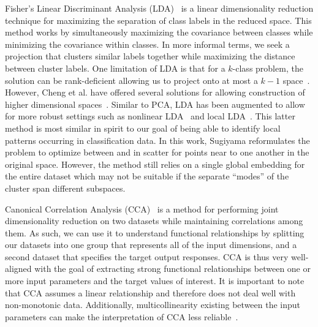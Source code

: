Fisher's Linear Discriminant Analysis (LDA)~\cite{Fisher1936} is a linear dimensionality reduction technique for maximizing the separation of class labels in the reduced space.
%
This method works by simultaneously maximizing the covariance between classes while minimizing the covariance within classes.
%
In more informal terms, we seek a projection that clusters similar labels together while maximizing the distance between cluster labels.
%
One limitation of LDA is that for a $k$-class problem, the solution can be rank-deficient allowing us to project onto at most a $k-1$ space~\cite{MaszczykDuch2008}.
%
However, Cheng et al. have offered several solutions for allowing construction of higher dimensional spaces~\cite{ChengZhuangYang1992}.
%
Similar to PCA, LDA has been augmented to allow for more robust settings such as nonlinear LDA~\cite{MikaRatschWeston1999,McLachlan2004} and local LDA~\cite{Sugiyama2006}.
%
This latter method is most similar in spirit to our goal of being able to identify local patterns occurring in classification data.
%
In this work, Sugiyama reformulates the problem to optimize between and in scatter for points near to one another in the original space.
%
However, the method still relies on a single global embedding for the entire dataset which may not be suitable if the separate ``modes'' of the cluster span different subspaces.

Canonical Correlation Analysis (CCA)~\cite{Hotelling1935,HardoonSzedmakShawe-Taylor2004} is a method for performing joint dimensionality reduction on two datasets while maintaining correlations among them.
%
As such, we can use it to understand functional relationships by splitting our datasets into one group that represents all of the input dimensions, and a second dataset that specifies the target output responses.
%
CCA is thus very well-aligned with the goal of extracting strong functional relationships between one or more input parameters and the target values of interest.
%
It is important to note that CCA assumes a linear relationship and therefore does not deal well with non-monotonic data.
%
Additionally, multicollinearity existing between the input parameters can make the interpretation of CCA less reliable~\cite{HairAndersonTatham1998}.

